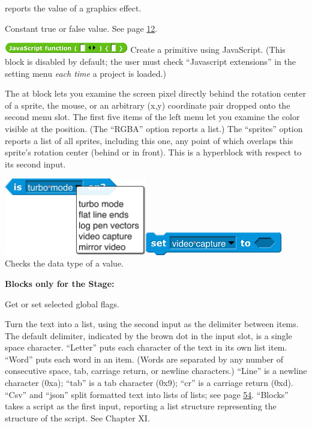 reports the value of a graphics effect.

Constant true or false value. See page
\hyperref[predicates-and-conditional-evaluation]{12}.

\includegraphics[width=2.13in,height=0.18in]{media/image153.png} Create
a primitive using JavaScript. (This block is disabled by default; the
user must check ``Javascript extensions'' in the setting menu \emph{each
time} a project is loaded.)

The at block lets you examine the screen pixel directly behind the
rotation center of a sprite, the mouse, or an arbitrary (x,y) coordinate
pair dropped onto the second menu slot. The first five items of the left
menu let you examine the color visible at the position. (The ``RGBA''
option reports a list.) The ``sprites'' option reports a list of all
sprites, including this one, any point of which overlaps this sprite's
rotation center (behind or in front). This is a hyperblock with respect
to its second input.

\includegraphics[width=2.44583in,height=1.32639in]{media/image162.png}\includegraphics[width=2.35556in,height=0.38889in]{media/image163.png}
Checks the data type of a value.

\textbf{Blocks only for the Stage:}

Get or set selected global flags.

Turn the text into a list, using the second input as the delimiter
between items. The default delimiter, indicated by the brown dot in the
input slot, is a single space character. ``Letter'' puts each character
of the text in its own list item. ``Word'' puts each word in an item.
(Words are separated by any number of consecutive space, tab, carriage
return, or newline characters.) ``Line'' is a newline character (0xa);
``tab'' is a tab character (0x9); ``cr'' is a carriage return (0xd).
``Csv'' and ``json'' split formatted text into lists of lists; see page
\hyperref[comma-separated-values]{54}. ``Blocks'' takes a script as the
first input, reporting a list structure representing the structure of
the script. See Chapter XI.

